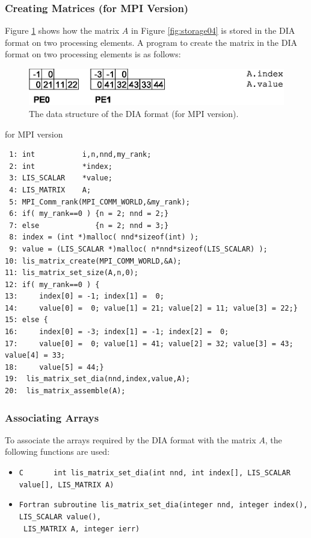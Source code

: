 \documentclass[a4paper]{article}
\begin{document}
\subsubsection{Creating Matrices (for MPI Version)}
Figure \ref{fig:storage04_mpi} shows how the matrix $A$ in Figure \ref{fig:storage04} is stored in the DIA format on two processing elements. A program to create the matrix in the DIA format on two processing elements is as follows:
\begin{figure}[h]
{\centering 
\includegraphics{storage04_mpi.eps} 
\caption{The data structure of the DIA format (for MPI version).}\label{fig:storage04_mpi}}
\end{figure}
\begin{itembox}[l]{for MPI version}
\small
\begin{verbatim}
 1: int           i,n,nnd,my_rank;
 2: int           *index;
 3: LIS_SCALAR    *value;
 4: LIS_MATRIX    A;
 5: MPI_Comm_rank(MPI_COMM_WORLD,&my_rank);
 6: if( my_rank==0 ) {n = 2; nnd = 2;}
 7: else             {n = 2; nnd = 3;}
 8: index = (int *)malloc( nnd*sizeof(int) );
 9: value = (LIS_SCALAR *)malloc( n*nnd*sizeof(LIS_SCALAR) );
10: lis_matrix_create(MPI_COMM_WORLD,&A);
11: lis_matrix_set_size(A,n,0);
12: if( my_rank==0 ) {
13:     index[0] = -1; index[1] =  0;
14:     value[0] =  0; value[1] = 21; value[2] = 11; value[3] = 22;}
15: else {
16:     index[0] = -3; index[1] = -1; index[2] =  0;
17:     value[0] =  0; value[1] = 41; value[2] = 32; value[3] = 43; value[4] = 33;
18:     value[5] = 44;}
19:  lis_matrix_set_dia(nnd,index,value,A);
20:  lis_matrix_assemble(A);
\end{verbatim}
\end{itembox}
\subsubsection{Associating Arrays}
To associate the arrays required by the DIA format with the matrix $A$, the following functions are used:
\begin{itemize}
\item \verb|C       int lis_matrix_set_dia(int nnd, int index[], LIS_SCALAR value[], LIS_MATRIX A)|
\item \verb|Fortran subroutine lis_matrix_set_dia(integer nnd, integer index(), LIS_SCALAR value(),|\\
      \verb| LIS_MATRIX A, integer ierr)|
\end{itemize}
\end{document}
